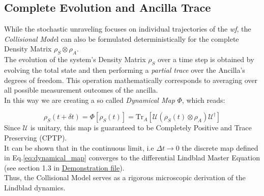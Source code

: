 \documentclass[a4paper,12pt]{article}
\begin{document}
	\subsection{Complete Evolution and Ancilla Trace}
	\label{sub:complete_evolution}
	While the stochastic unraveling focuses on individual trajectories of the \textit{wf}, the \textit{Collisional Mode}l can also be formulated deterministically for the complete Density Matrix $ \rho_S \otimes \rho_A $. \\
	The evolution of the system's Density Matrix $\rho_S$ over a time step is obtained by evolving the total state and then performing a \textit{partial trace} over the Ancilla's degrees of freedom. This operation mathematically corresponds to averaging over all possible measurement outcomes of the ancilla. \\
	In this way we are creating a so called \textit{Dynamical Map} $ \Phi $, which reads:

	\begin{equation}
		\rho_S(t + \delta t) = \Phi[\rho_S(t)] = \text{Tr}_A \left[ \mathcal{U} \left( \rho_S(t) \otimes \rho_A \right) \mathcal{U} ^\dagger \right]
		\label{eq:dynamical_map}
	\end{equation}
	Since $\mathcal{U}$ is unitary, this map is guaranteed to be Completely Positive and Trace Preserving (CPTP).\\
	It can be shown that in the continuous limit, i.e $ \Delta t \rightarrow 0 $ the discrete map defined in Eq.\eqref{eq:dynamical_map} converges to the differential Lindblad Master Equation (see section 1.3 in \href{run:./Demonstration.pdf}{Demonstration file}). \\
	Thus, the Collisional Model serves as a rigorous microscopic derivation of the Lindblad dynamics.
\end{document}
